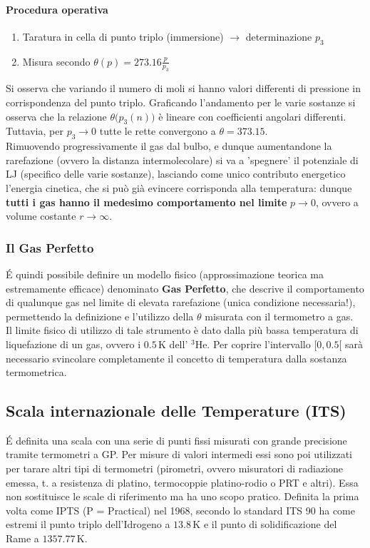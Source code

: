 \documentclass[10pt, oneside]{book}
\begin{document}
\paragraph{Procedura operativa}
\begin{enumerate}
\item Taratura in cella di punto triplo (immersione) $\rightarrow$ determinazione $p_3$
\item Misura secondo $\displaystyle \theta(p) = 273.16 \frac{p}{p_3}$
\end{enumerate}
Si osserva che variando il numero di moli si hanno valori differenti di pressione in corrispondenza del punto triplo. Graficando l'andamento per le varie sostanze si osserva che la relazione $\theta\big(p_3(n)\big)$ è lineare con coefficienti angolari differenti. Tuttavia, per $p_3 \rightarrow 0$ tutte le rette convergono a $\theta = 373.15$.
\\Rimuovendo progressivamente il gas dal bulbo, e dunque aumentandone la rarefazione (ovvero la distanza intermolecolare) si va a 'spegnere' il potenziale di LJ (specifico delle varie sostanze), lasciando come unico contributo energetico l'energia cinetica, che si può già evincere corrisponda alla temperatura: dunque \textbf{tutti i gas hanno il medesimo comportamento nel limite} $p 	\rightarrow 0$, ovvero a volume costante $r \rightarrow \infty$.
\subsubsection*{Il Gas Perfetto}
\'E quindi possibile definire un modello fisico (approssimazione teorica ma estremamente efficace) denominato \textbf{Gas Perfetto}, che descrive il comportamento di qualunque gas nel limite di elevata rarefazione (unica condizione necessaria!), permettendo la definizione e l'utilizzo della $\theta$ misurata con il termometro a gas. 
\\Il limite fisico di utilizzo di tale strumento è dato dalla più bassa temperatura di liquefazione di un gas, ovvero i $0.5 \, \mathrm{K}$ dell' $\mathrm{{}^3He}$. Per coprire l'intervallo $[0, 0.5[$ sarà necessario svincolare completamente il concetto di temperatura dalla sostanza termometrica.

\subsection{Scala internazionale delle Temperature (ITS)}
\'E definita una scala con una serie di punti fissi misurati con grande precisione tramite termometri a GP. Per misure di valori intermedi essi sono poi utilizzati per tarare altri tipi di termometri (pirometri, ovvero misuratori di radiazione emessa, t. a resistenza di platino, termocoppie platino-rodio o PRT e altri). Essa non sostituisce le scale di riferimento ma ha uno scopo pratico. Definita la prima volta come IPTS (P = Practical) nel 1968, secondo lo standard ITS 90 ha come estremi il punto triplo dell'Idrogeno a $13.8 \, \mathrm{K}$ e il punto di solidificazione del Rame a $1357.77 \, \mathrm{K}$.
\end{document}
